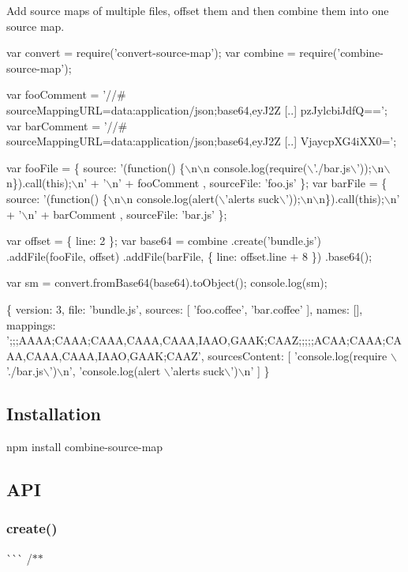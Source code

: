 Add source maps of multiple files, offset them and then combine them into one source map.


\begin{DoxyCode}
var convert = require('convert-source-map');
var combine = require('combine-source-map');

var fooComment = '//# sourceMappingURL=data:application/json;base64,eyJ2Z [..] pzJylcbiJdfQ==';
var barComment = '//# sourceMappingURL=data:application/json;base64,eyJ2Z [..] VjaycpXG4iXX0=';

var fooFile = \{
    source: '(function() \{\(\backslash\)n\(\backslash\)n  console.log(require(\(\backslash\)'./bar.js\(\backslash\)'));\(\backslash\)n\(\backslash\)n\}).call(this);\(\backslash\)n' + '\(\backslash\)n' +
       fooComment
  , sourceFile: 'foo.js'
\};
var barFile = \{
    source: '(function() \{\(\backslash\)n\(\backslash\)n  console.log(alert(\(\backslash\)'alerts suck\(\backslash\)'));\(\backslash\)n\(\backslash\)n\}).call(this);\(\backslash\)n' + '\(\backslash\)n' +
       barComment
  , sourceFile: 'bar.js'
\};

var offset = \{ line: 2 \};
var base64 = combine
  .create('bundle.js')
  .addFile(fooFile, offset)
  .addFile(barFile, \{ line: offset.line + 8 \})
  .base64();

var sm = convert.fromBase64(base64).toObject();
console.log(sm);
\end{DoxyCode}



\begin{DoxyCode}
\{ version: 3,
  file: 'bundle.js',
  sources: [ 'foo.coffee', 'bar.coffee' ],
  names: [],
  mappings: ';;;AAAA;CAAA;CAAA,CAAA,CAAA,IAAO,GAAK;CAAZ;;;;;ACAA;CAAA;CAAA,CAAA,CAAA,IAAO,GAAK;CAAZ',
  sourcesContent:
   [ 'console.log(require \(\backslash\)'./bar.js\(\backslash\)')\(\backslash\)n',
     'console.log(alert \(\backslash\)'alerts suck\(\backslash\)')\(\backslash\)n' ] \}
\end{DoxyCode}


\subsection*{Installation}

\begin{DoxyVerb}npm install combine-source-map
\end{DoxyVerb}


\subsection*{A\+PI}

\subsubsection*{create()}

\`{}\`{}\`{} /$\ast$$\ast$
\begin{DoxyItemize}
\item 
\end{DoxyItemize}